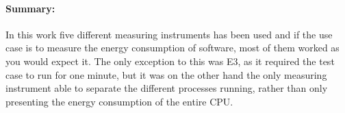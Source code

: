 \paragraph*{Summary:} In this work five different measuring instruments has been used and if the use case is to measure the energy consumption of software, most of them worked as you would expect it. The only exception to this was E3, as it required the test case to run for one minute, but it was on the other hand the only measuring instrument able to separate the different processes running, rather than only presenting the energy consumption of the entire CPU. 